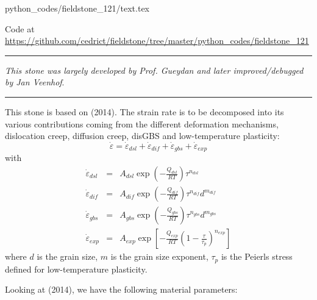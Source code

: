 \begin{flushright} {\tiny {\color{gray} python\_codes/fieldstone\_121/text.tex}} \end{flushright}

\begin{center}

Code at \url{https://github.com/cedrict/fieldstone/tree/master/python_codes/fieldstone_121}
\end{center}

\par\noindent\rule{\textwidth}{0.4pt}

{\sl This stone was largely developed by Prof. Gueydan and later improved/debugged 
by Jan Veenhof}. 

\par\noindent\rule{\textwidth}{0.4pt}

This stone is based on \textcite{gupr14} (2014). 
The strain rate is to be decomposed into its various contributions 
coming from the different deformation mechanisms, dislocation creep,
diffusion creep, disGBS and low-temperature plasticity:
\[
\dot\varepsilon = \dot\varepsilon_{dsl} + \dot\varepsilon_{dif} + 
\dot\varepsilon_{gbs} + \dot\varepsilon_{exp} 
\]
with
\begin{eqnarray}
\dot{\varepsilon}_{dsl}&=&A_{dsl}\exp\left(-\frac{Q_{dsl}}{RT} \right) \tau^{n_{dsl}}  \\
\dot{\varepsilon}_{dif}&=&A_{dif}\exp\left(-\frac{Q_{dif}}{RT} \right) \tau^{n_{dif}} d^{m_{dif}} \\
\dot{\varepsilon}_{gbs}&=&A_{gbs}\exp\left(-\frac{Q_{gbs}}{RT} \right) \tau^{n_{gbs}} d^{m_{gbs}} \\
\dot{\varepsilon}_{exp}&=&A_{exp}\exp\left[-\frac{Q_{exp}}{RT} \left(1 -\frac{\tau}{\tau_p}\right)^{n_{exp}} \right]   
\end{eqnarray}
where $d$ is the grain size, $m$ is the grain size exponent, $\tau_p$ is the Peierls stress defined
for low-temperature plasticity.

Looking at \textcite{gupr14} (2014), we have the following material parameters:


